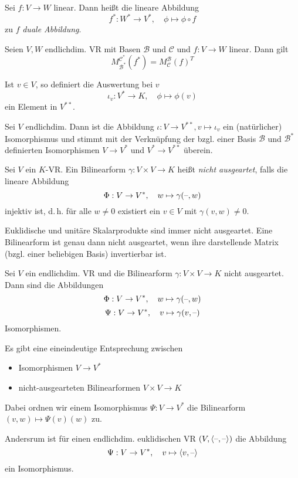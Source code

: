\documentclass{cheat-sheet}
\newcommand{\BB}{\mathcal{B}}
\newcommand{\BC}{\mathcal{C}}
\begin{document}
\begin{defn}
  Sei $f : V \to W$ linear. Dann heißt die lineare Abbildung
  \[ f^* : W^* \to V^*, \quad \phi \mapsto \phi \circ f \]
  zu $f$ \emph{duale Abbildung}.
\end{defn}

\begin{satz}
  Seien $V, W$ endlichdim. VR mit Basen $\BB$ und $\BC$ und $f : V \to W$ linear. Dann gilt
  \[ M_{\BB^*}^{\BC^*}(f^*) = M_{\BC}^{\BB}(f)^T \]
\end{satz}

\begin{defn}
  Ist $v \in V$, so definiert die Auswertung bei $v$
  \[ \iota_v : V^* \to K, \quad \phi \mapsto \phi(v) \]
  ein Element in $V^{**}$.
\end{defn}

\begin{satz}
  Sei $V$ endlichdim. Dann ist die Abbildung $\iota : V \to V^{**}, v \mapsto \iota_v$ ein (natürlicher) Isomorphismus und stimmt mit der Verknüpfung der bzgl. einer Basis $\BB$ und $\mathcal{B^*}$ definierten Isomorphismen $V \to V^*$ und $V^* \to V^{**}$ überein.
\end{satz}

\begin{defn}
  Sei $V$ ein $K$-VR. Ein Bilinearform $\gamma : V \times V \to K$ heißt \emph{nicht ausgeartet}, falls die lineare Abbildung
  \[ \Phi : V \to V^{*}, \quad w \mapsto \gamma(\text{--}, w) \]
  injektiv ist, d.\,h. für alle $w \not= 0$ existiert ein $v \in V$ mit $\gamma(v, w) \not= 0$.
\end{defn}

\begin{bem}
  Euklidische und unitäre Skalarprodukte sind immer nicht ausgeartet.
  Eine Bilinearform ist genau dann nicht ausgeartet, wenn ihre darstellende Matrix (bzgl. einer beliebigen Basis) invertierbar ist.
\end{bem}

\begin{satz}
  Sei $V$ ein endlichdim. VR und die Bilinearform $\gamma : V \times V \to K$ nicht ausgeartet. Dann sind die Abbildungen
  \[ \Phi : V \to V^*, \quad w \mapsto \gamma(\text{--}, w) \]
  \[ \Psi : V \to V^*, \quad v \mapsto \gamma(v, \text{--}) \]
  Isomorphismen.
\end{satz}

\begin{satz}
  Es gibt eine eineindeutige Entsprechung zwischen
  \begin{itemize}
    \item Isomorphismen $V \to V^*$
    \item nicht-ausgearteten Bilinearformen $V \times V \to K$
  \end{itemize}

  Dabei ordnen wir einem Isomorphismus $\Psi : V \to V^*$ die Bilinearform $(v, w) \mapsto \Psi(v)(w)$ zu.

  Andersrum ist für einen endlichdim. euklidischen VR $(V, \langle \text{--} , \text{--} \rangle)$ die Abbildung
  \[ \Psi : V \to V^*, \quad v \mapsto \langle v , \text{--} \rangle \]
  ein Isomorphismus.
\end{satz}
\end{document}
